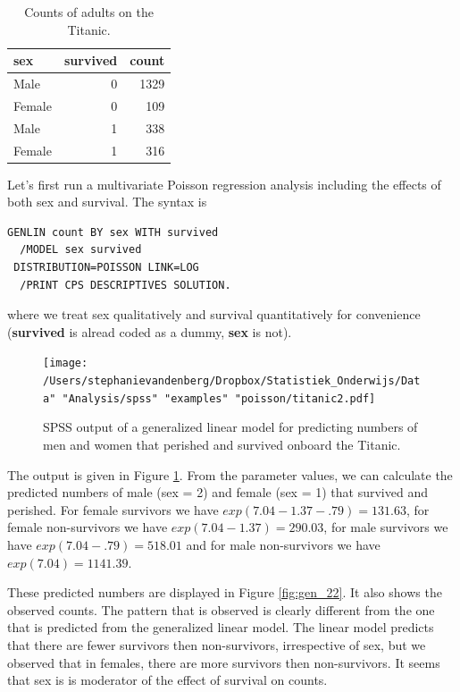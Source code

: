 \documentclass[]{book}\usepackage[]{graphicx}\usepackage[]{color}
\begin{document}
\begin{table}[ht]
\centering
\caption{Counts of adults on the Titanic.} 
\label{tab:gen_21}
\begin{tabular}{lrr}
  \hline
sex & survived & count \\ 
  \hline
Male & 0 & 1329 \\ 
  Female & 0 & 109 \\ 
  Male & 1 & 338 \\ 
  Female & 1 & 316 \\ 
   \hline
\end{tabular}
\end{table}


Let's first run a multivariate Poisson regression analysis including the effects of both sex and survival. The syntax is


\begin{verbatim}
GENLIN count BY sex WITH survived
  /MODEL sex survived
 DISTRIBUTION=POISSON LINK=LOG
  /PRINT CPS DESCRIPTIVES SOLUTION.
\end{verbatim}

where we treat sex qualitatively and survival quantitatively for convenience (\textbf{survived} is alread coded as a dummy, \textbf{sex} is not).


\begin{figure}[h]
    \begin{center}
       \texttt{[image: /Users/stephanievandenberg/Dropbox/Statistiek\_Onderwijs/Data" "Analysis/spss" "examples" "poisson/titanic2.pdf]}
    \end{center}
     \caption{SPSS output of a generalized linear model for predicting numbers of men and women that perished and survived onboard the Titanic.}
    \label{fig:titanic2}
\end{figure}

The output is given in Figure \ref{fig:titanic2}. From the parameter values, we can calculate the predicted numbers of male (sex = 2) and female (sex = 1) that survived and perished. For female survivors we have $exp(7.04 -1.37 -.79)=131.63$, for female non-survivors we have $exp(7.04 -1.37)=290.03$, for male survivors we have $exp(7.04 -.79)=518.01$ and for male non-survivors we have $exp(7.04)=1141.39$.


These predicted numbers are displayed in Figure \ref{fig:gen_22}. It also shows the observed counts. The pattern that is observed is clearly different from the one that is predicted from the generalized linear model. The linear model predicts that there are fewer survivors then non-survivors, irrespective of sex, but we observed that in females, there are more survivors then non-survivors. It seems that sex is is moderator of the effect of survival on counts.
\end{document}
